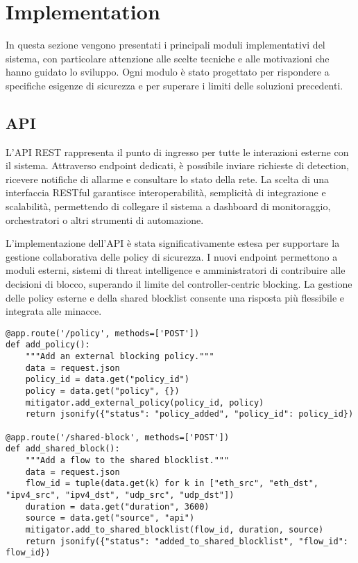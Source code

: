 \chapter{Implementation}

In questa sezione vengono presentati i principali moduli implementativi del sistema, con particolare attenzione alle scelte tecniche e alle motivazioni che hanno guidato lo sviluppo. Ogni modulo è stato progettato per rispondere a specifiche esigenze di sicurezza e per superare i limiti delle soluzioni precedenti.

\section{API}
L'API REST rappresenta il punto di ingresso per tutte le interazioni esterne con il sistema. Attraverso endpoint dedicati, è possibile inviare richieste di detection, ricevere notifiche di allarme e consultare lo stato della rete. La scelta di una interfaccia RESTful garantisce interoperabilità, semplicità di integrazione e scalabilità, permettendo di collegare il sistema a dashboard di monitoraggio, orchestratori o altri strumenti di automazione.\par
L'implementazione dell'API è stata significativamente estesa per supportare la gestione collaborativa delle policy di sicurezza. I nuovi endpoint permettono a moduli esterni, sistemi di threat intelligence e amministratori di contribuire alle decisioni di blocco, superando il limite del controller-centric blocking. La gestione delle policy esterne e della shared blocklist consente una risposta più flessibile e integrata alle minacce.
\begin{verbatim}
@app.route('/policy', methods=['POST'])
def add_policy():
    """Add an external blocking policy."""
    data = request.json
    policy_id = data.get("policy_id")
    policy = data.get("policy", {})
    mitigator.add_external_policy(policy_id, policy)
    return jsonify({"status": "policy_added", "policy_id": policy_id})

@app.route('/shared-block', methods=['POST'])
def add_shared_block():
    """Add a flow to the shared blocklist."""
    data = request.json
    flow_id = tuple(data.get(k) for k in ["eth_src", "eth_dst", "ipv4_src", "ipv4_dst", "udp_src", "udp_dst"])
    duration = data.get("duration", 3600)
    source = data.get("source", "api")
    mitigator.add_to_shared_blocklist(flow_id, duration, source)
    return jsonify({"status": "added_to_shared_blocklist", "flow_id": flow_id})
\end{verbatim}

